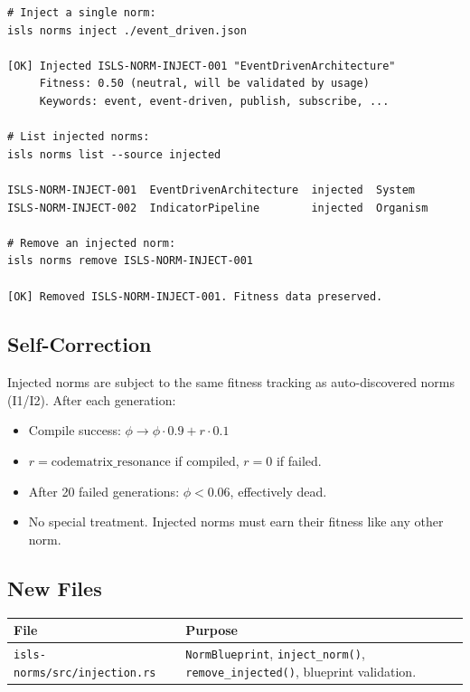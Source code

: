 \documentclass[11pt,a4paper]{article}
\begin{document}
\begin{lstlisting}[style=bash]
# Inject a single norm:
isls norms inject ./event_driven.json

[OK] Injected ISLS-NORM-INJECT-001 "EventDrivenArchitecture"
     Fitness: 0.50 (neutral, will be validated by usage)
     Keywords: event, event-driven, publish, subscribe, ...

# List injected norms:
isls norms list --source injected

ISLS-NORM-INJECT-001  EventDrivenArchitecture  injected  System
ISLS-NORM-INJECT-002  IndicatorPipeline        injected  Organism

# Remove an injected norm:
isls norms remove ISLS-NORM-INJECT-001

[OK] Removed ISLS-NORM-INJECT-001. Fitness data preserved.
\end{lstlisting}

\subsection{Self-Correction}

Injected norms are subject to the same fitness tracking as 
auto-discovered norms (I1/I2). After each generation:

\begin{itemize}[nosep]
\item Compile success: $\phi \to \phi \cdot 0.9 + r \cdot 0.1$
\item $r = \text{codematrix\_resonance}$ if compiled, 
      $r = 0$ if failed.
\item After 20 failed generations: $\phi < 0.06$, 
      effectively dead.
\item No special treatment. Injected norms must earn their 
      fitness like any other norm.
\end{itemize}

\subsection{New Files}

\begin{longtable}{lp{10cm}}
\toprule
\textbf{File} & \textbf{Purpose} \\
\midrule
\texttt{isls-norms/src/injection.rs}
  & \texttt{NormBlueprint}, \texttt{inject\_norm()}, 
    \texttt{remove\_injected()}, blueprint validation. \\
\bottomrule
\end{longtable}
\end{document}
